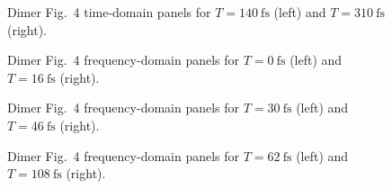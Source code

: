 \begin{figure}[p]
    \centering
    \begin{minipage}[t]{0.49\linewidth}
        \centering
        \safeplaceholdergraphic[0.98\linewidth]{\dimerFigFourWaitOneFortyPaperTimePath}
    \end{minipage}\hfill
    \begin{minipage}[t]{0.49\linewidth}
        \centering
        \safeplaceholdergraphic[0.98\linewidth]{\dimerFigFourWaitThreeTenPaperTimePath}
    \end{minipage}
    \caption{Dimer Fig.~4 time-domain panels for $T=\SI{140}{\femto\second}$ (left) and $T=\SI{310}{\femto\second}$ (right).}
    \label{fig:app_dimer_fig4_time_t140_t310}
\end{figure}

\begin{figure}[p]
    \centering
    \begin{minipage}[t]{0.49\linewidth}
        \centering
        \safeplaceholdergraphic[0.98\linewidth]{\dimerFigFourWaitZeroPaperPath}
    \end{minipage}\hfill
    \begin{minipage}[t]{0.49\linewidth}
        \centering
        \safeplaceholdergraphic[0.98\linewidth]{\dimerFigFourWaitSixteenPaperPath}
    \end{minipage}
    \caption{Dimer Fig.~4 frequency-domain panels for $T=\SI{0}{\femto\second}$ (left) and $T=\SI{16}{\femto\second}$ (right).}
    \label{fig:app_dimer_fig4_freq_t0_t16}
\end{figure}

\begin{figure}[p]
    \centering
    \begin{minipage}[t]{0.49\linewidth}
        \centering
        \safeplaceholdergraphic[0.98\linewidth]{\dimerFigFourWaitThirtyPaperPath}
    \end{minipage}\hfill
    \begin{minipage}[t]{0.49\linewidth}
        \centering
        \safeplaceholdergraphic[0.98\linewidth]{\dimerFigFourWaitFortySixPaperPath}
    \end{minipage}
    \caption{Dimer Fig.~4 frequency-domain panels for $T=\SI{30}{\femto\second}$ (left) and $T=\SI{46}{\femto\second}$ (right).}
    \label{fig:app_dimer_fig4_freq_t30_t46}
\end{figure}

\begin{figure}[p]
    \centering
    \begin{minipage}[t]{0.49\linewidth}
        \centering
        \safeplaceholdergraphic[0.98\linewidth]{\dimerFigFourWaitSixtyTwoPaperPath}
    \end{minipage}\hfill
    \begin{minipage}[t]{0.49\linewidth}
        \centering
        \safeplaceholdergraphic[0.98\linewidth]{\dimerFigFourWaitOneOhEightPaperPath}
    \end{minipage}
    \caption{Dimer Fig.~4 frequency-domain panels for $T=\SI{62}{\femto\second}$ (left) and $T=\SI{108}{\femto\second}$ (right).}
    \label{fig:app_dimer_fig4_freq_t62_t108}
\end{figure}

